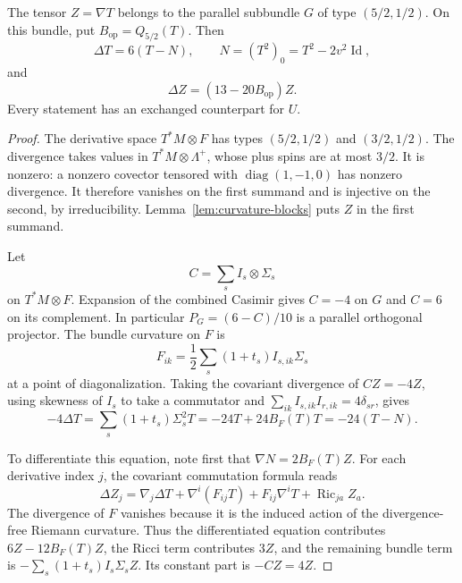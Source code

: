\begin{proposition}
\label{prop:weyl-derivative-equations}
The tensor $Z=\nabla T$ belongs to the parallel subbundle
$G$ of type $(5/2,1/2)$. On this bundle, put
$B_{\mathrm{op}}=Q_{5/2}(T)$. Then
\[
 \Delta T=6(T-N),\qquad
 N=(T^2)_0=T^2-2v^2\operatorname{Id},
\]
and
\begin{equation}
 \Delta Z=(13-20B_{\mathrm{op}})Z.
 \tag{1}\label{eq:1}
\end{equation}
Every statement has an exchanged counterpart for $U$.
\end{proposition}

\begin{proof}
The derivative space $T^*M\otimes F$ has types
$(5/2,1/2)$ and $(3/2,1/2)$. The divergence takes values in
$T^*M\otimes\Lambda^+$, whose plus spins are at most $3/2$.
It is nonzero: a nonzero covector
tensored with $\operatorname{diag}(1,-1,0)$ has nonzero divergence.
It therefore vanishes on the first summand and is injective on the
second, by irreducibility. Lemma~\ref{lem:curvature-blocks} puts $Z$
in the first summand.

Let
\[
 C=\sum_s I_s\otimes\Sigma_s
\]
on $T^*M\otimes F$. Expansion of the combined Casimir gives
$C=-4$ on $G$ and $C=6$ on its complement. In particular
$P_G=(6-C)/10$ is a parallel orthogonal projector. The bundle
curvature on $F$ is
\[
 F_{ik}=\frac12\sum_s(1+t_s)I_{s,ik}\Sigma_s
\]
at a point of diagonalization. Taking the covariant divergence of
$CZ=-4Z$, using skewness of $I_s$ to take a commutator and
$\sum_{ik}I_{s,ik}I_{r,ik}=4\delta_{sr}$, gives
\[
 -4\Delta T=\sum_s(1+t_s)\Sigma_s^2T
            =-24T+24B_F(T)T=-24(T-N).
\]

To differentiate this equation, note first that
$\nabla N=2B_F(T)Z$. For each derivative index $j$, the covariant
commutation formula reads
\[
 \Delta Z_j
 =\nabla_j\Delta T+\nabla^i(F_{ij}T)
                    +F_{ij}\nabla^iT
                    +\operatorname{Ric}_{ja}Z_a.
\]
The divergence of $F$ vanishes because it is the induced action of
the divergence-free Riemann curvature. Thus the differentiated
equation contributes $6Z-12B_F(T)Z$, the Ricci term contributes
$3Z$, and the remaining bundle term is
$-\sum_s(1+t_s)I_s\Sigma_sZ$. Its constant part is $-CZ=4Z$.


\end{proof}
